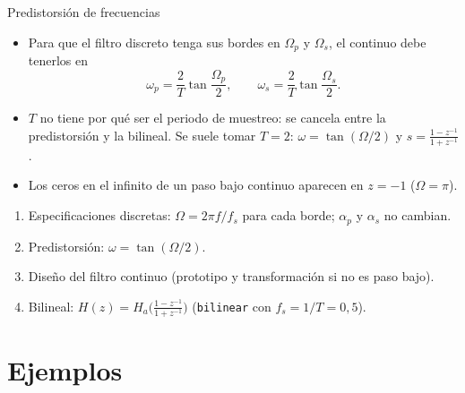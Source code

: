 \documentclass[aspectratio=169,11pt]{beamer}
\begin{document}
\begin{frame}{Predistorsión de frecuencias}
  \small
  \begin{itemize}
    \item Para que el filtro discreto tenga sus bordes en $\Omega_p$ y $\Omega_s$, el continuo debe tenerlos en
    \[
      \omega_p=\frac2T\tan\frac{\Omega_p}{2},\qquad\omega_s=\frac2T\tan\frac{\Omega_s}{2}.
    \]
    \item $T$ no tiene por qué ser el periodo de muestreo: se cancela entre la predistorsión y la bilineal. Se suele tomar \alert{$T=2$}: $\omega=\tan(\Omega/2)$ y $s=\frac{1-z^{-1}}{1+z^{-1}}$.
    \item Los ceros en el infinito de un paso bajo continuo aparecen en $z=-1$ ($\Omega=\pi$).
  \end{itemize}
  \begin{importante}[Procedimiento]
    \begin{enumerate}\setlength{\itemsep}{0pt}
      \item Especificaciones discretas: $\Omega=2\pi f/f_s$ para cada borde; $\alpha_p$ y $\alpha_s$ no cambian.
      \item Predistorsión: $\omega=\tan(\Omega/2)$.
      \item Diseño del filtro continuo (prototipo y transformación si no es paso bajo).
      \item Bilineal: $H(z)=H_a\big(\frac{1-z^{-1}}{1+z^{-1}}\big)$ (\texttt{bilinear} con $f_s=1/T=0{,}5$).
    \end{enumerate}
  \end{importante}
\end{frame}

\section{Ejemplos}
\end{document}
